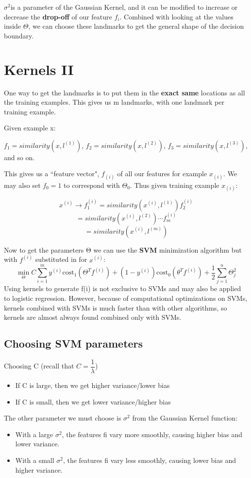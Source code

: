 $\sigma^2$is a parameter of the Gaussian Kernel, and it can be modified to increase or decrease the \textbf{drop-off} of our feature $f_i$. Combined with looking at the values inside $\Theta$, we can choose these landmarks to get the general shape of the decision boundary.

\section{Kernels II}
One way to get the landmarks is to put them in the \textbf{exact same} locations as all the training examples. This gives us m landmarks, with one landmark per training example.

Given example x:

$f_1 = similarity(x,l^{(1)})$, $f_2 = similarity(x,l^{(2)})$, $f_3 = similarity(x,l^{(3)})$, and so on.

This gives us a ``feature vector", $f_{(i)}$ of all our features for example $x_{(i)}$. We may also set $f_0 = 1$ to correspond with $\Theta_0$. Thus given training example $x_{(i)}$:

$$x^{(i)} \rightarrow f^{(i)}_1=similarity(x^{(i)},l^{(1)})f^{(i)}_2$$
$$=similarity(x^{(i)},l^{(2)})\cdots f^{(i)}_m$$
$$=similarity(x^{(i)},l^{(m)})$$

Now to get the parameters Θ we can use the \textbf{SVM} minimization algorithm but with $f^{(i)}$ substituted in for $x^{(i)}$:
$$
\min_{\Theta} C \sum_{i=1}^m y^{(i)}\text{cost}_1(\Theta^Tf^{(i)}) + (1 - y^{(i)})\text{cost}_0(\theta^Tf^{(i)}) + \dfrac{1}{2}\sum_{j=1}^n \Theta^2_j
$$
Using kernels to generate f(i) is not exclusive to SVMs and may also be applied to logistic regression. However, because of computational optimizations on SVMs, kernels combined with SVMs is much faster than with other algorithms, so kernels are almost always found combined only with SVMs.
\subsection{Choosing SVM parameters}
Choosing C (recall that $C = \dfrac{1}{\lambda}$)
\begin{itemize}
\item If C is large, then we get higher variance/lower bias
\item If C is small, then we get lower variance/higher bias
\end{itemize}

The other parameter we must choose is $\sigma^2$ from the Gaussian Kernel function:
\begin{itemize}
\item With a large $\sigma^2$, the features fi vary more smoothly, causing higher bias and lower variance.
\item With a small $\sigma^2$, the features fi vary less smoothly, causing lower bias and higher variance.
\end{itemize}

